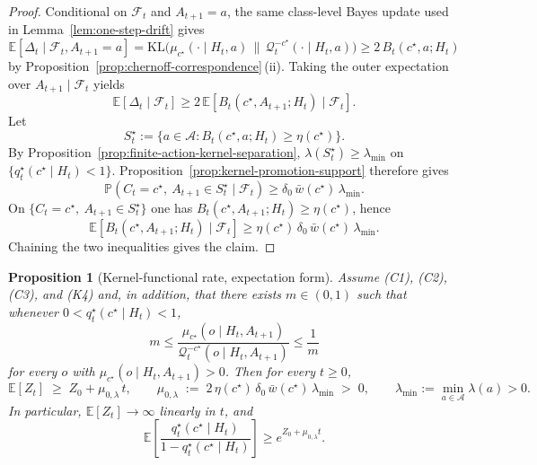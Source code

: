 \documentclass[11pt]{article}
\newtheorem{proposition}[theorem]{Proposition}
\theoremstyle{definition}
\theoremstyle{remark}
\newcommand{\Acal}{\mathcal{A}}
\newcommand{\Qcal}{\mathcal{Q}}
\newcommand{\E}{\mathbb{E}}
\newcommand{\Prob}{\mathbb{P}}
\newcommand{\KL}{\mathrm{KL}}
\begin{document}
\begin{proof}
Conditional on $\mathcal F_t$ and $A_{t+1}=a$, the same class-level Bayes update used in Lemma~\ref{lem:one-step-drift} gives
\[
\E[\Delta_t\mid\mathcal F_t,A_{t+1}=a]
=
\KL\!\bigl(\mu_{c^\star}(\cdot\mid H_t,a)\,\|\,\Qcal_t^{-c^\star}(\cdot\mid H_t,a)\bigr)
\ge 2\,B_t(c^\star,a;H_t)
\]
by Proposition~\ref{prop:chernoff-correspondence}\,(ii). Taking the outer expectation over $A_{t+1}\mid\mathcal F_t$ yields
\[
\E[\Delta_t\mid\mathcal F_t]\ge 2\,\E[B_t(c^\star,A_{t+1};H_t)\mid\mathcal F_t].
\]
Let
\[
S_t^\star:=\{a\in\Acal:B_t(c^\star,a;H_t)\ge \eta(c^\star)\}.
\]
By Proposition~\ref{prop:finite-action-kernel-separation}, $\lambda(S_t^\star)\ge \lambda_{\min}$ on $\{q_t^\star(c^\star\mid H_t)<1\}$. Proposition~\ref{prop:kernel-promotion-support} therefore gives
\[
\Prob(C_t=c^\star,\ A_{t+1}\in S_t^\star\mid\mathcal F_t)\ge \delta_0\,\bar w(c^\star)\,\lambda_{\min}.
\]
On $\{C_t=c^\star,\ A_{t+1}\in S_t^\star\}$ one has $B_t(c^\star,A_{t+1};H_t)\ge \eta(c^\star)$, hence
\[
\E[B_t(c^\star,A_{t+1};H_t)\mid\mathcal F_t]
\ge
\eta(c^\star)\,\delta_0\,\bar w(c^\star)\,\lambda_{\min}.
\]
Chaining the two inequalities gives the claim.
\end{proof}

\begin{proposition}[Kernel-functional rate, expectation form]
\label{prop:kernel-exp-rate}
Assume \textup{(C1)}, \textup{(C2)}, \textup{(C3)}, and \textup{(K4)} and, in addition, that there exists $m\in(0,1)$ such that whenever $0<q_t^\star(c^\star\mid H_t)<1$,
\[
m\le
\frac{\mu_{c^\star}(o\mid H_t,A_{t+1})}{\Qcal_t^{-c^\star}(o\mid H_t,A_{t+1})}
\le \frac{1}{m}
\]
for every $o$ with $\mu_{c^\star}(o\mid H_t,A_{t+1})>0$. Then for every $t\ge 0$,
\[
\E[Z_t]\;\ge\;Z_0+\mu_{0,\lambda}\,t,
\qquad
\mu_{0,\lambda}\;:=\;2\,\eta(c^\star)\,\delta_0\,\bar w(c^\star)\,\lambda_{\min}\;>\;0,
\qquad
\lambda_{\min}:=\min_{a\in\Acal}\lambda(a)>0.
\]
In particular, $\E[Z_t]\to\infty$ linearly in $t$, and
\[
\E\!\left[\frac{q_t^\star(c^\star\mid H_t)}{1-q_t^\star(c^\star\mid H_t)}\right]\ge e^{Z_0+\mu_{0,\lambda} t}.
\]
\end{proposition}
\end{document}
